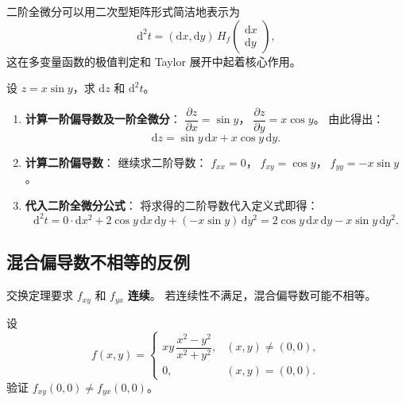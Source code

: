 \documentclass[lang=cn,11pt]{elegantbook}
\begin{document}
\begin{note}
二阶全微分可以用二次型矩阵形式简洁地表示为
\[
\mathrm{d}^2t=(\mathrm{d}x,\mathrm{d}y)\,H_f\begin{pmatrix}\mathrm{d}x\\\mathrm{d}y\end{pmatrix},
\]
这在多变量函数的极值判定和 Taylor 展开中起着核心作用。
\end{note}

\begin{exercise}[二阶全微分的计算] \label{ex:2nd-diff}
设 $z=x\sin y$，求 $\mathrm{d}z$ 和 $\mathrm{d}^2t$。
\end{exercise}

\begin{solution}
\begin{enumerate}
  \item \textbf{计算一阶偏导数及一阶全微分}：
  $\dfrac{\partial z}{\partial x}=\sin y$，$\;\dfrac{\partial z}{\partial y}=x\cos y$。
  由此得出：
  \[
  \mathrm{d}z=\sin y\,\mathrm{d}x+x\cos y\,\mathrm{d}y.
  \]

  \item \textbf{计算二阶偏导数}：
  继续求二阶导数：
  $f_{xx}=0$，$\;f_{xy}=\cos y$，$\;f_{yy}=-x\sin y$。

  \item \textbf{代入二阶全微分公式}：
  将求得的二阶导数代入定义式即得：
  \[
  \mathrm{d}^2t = 0\cdot \mathrm{d}x^2 + 2\cos y\,\mathrm{d}x\,\mathrm{d}y + (-x\sin y)\,\mathrm{d}y^2
       = \boxed{2\cos y\,\mathrm{d}x\,\mathrm{d}y-x\sin y\,\mathrm{d}y^2}.
  \]
\end{enumerate}
\end{solution}


\subsection{混合偏导数不相等的反例}

交换定理要求 $f_{xy}$ 和 $f_{yx}$ \textbf{连续}。
若连续性不满足，混合偏导数可能不相等。

\begin{exercise}[混合偏导数不相等] \label{ex:mixed-pd-unequal}
设
\[
f(x,y)=
\begin{cases}
xy\,\dfrac{x^2-y^2}{x^2+y^2},&(x,y)\neq(0,0),\\[10pt]
0,&(x,y)=(0,0).
\end{cases}
\]
验证 $f_{xy}(0,0)\neq f_{yx}(0,0)$。
\end{exercise}
\end{document}
